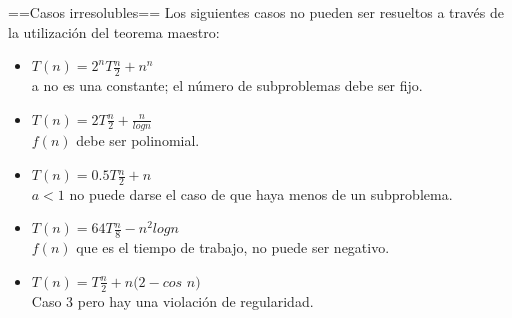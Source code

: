 \documentclass[12pt]{article}
\begin{document}
==Casos irresolubles==
Los siguientes casos no pueden ser resueltos a través de la utilización del teorema maestro:\cite{wiki:solutions}
\begin {itemize}
\item$T(n)=2^nT\frac{n}{2}+n^n$\\
a no es una constante; el número de subproblemas debe ser fijo.
\item$T(n)=2T\frac{n}{2}+\frac{n}{log n}$\\
$f(n)$ debe ser polinomial.
\item$T(n)=0.5T\frac{n}{2}+n$\\
$a<1$ no puede darse el caso de que haya menos de un subproblema.
\item$T(n)=64T\frac{n}{8}-n^2logn$\\
$f(n)$ que es el tiempo de trabajo, no puede ser negativo.
\item$T(n)=T\frac{n}{2}+n(2-cos$ $n)$\\
Caso 3 pero hay una violación de regularidad.
\end{itemize}









\printbibliography%
\end{document}
